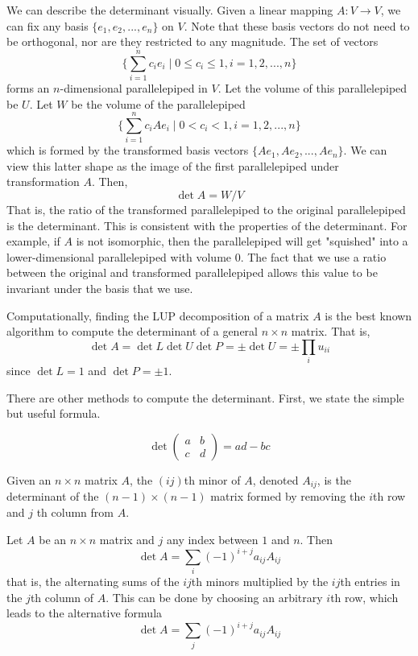   We can describe the determinant visually. Given a linear mapping $A: V \longrightarrow V$, we can fix any basis $\{e_1, e_2, ..., e_n\}$ on $V$. Note that these basis vectors do not need to be orthogonal, nor are they restricted to any magnitude. The set of vectors 
  \[\Big\{ \sum_{i=1}^n c_i e_i \; | \; 0 \leq c_i \leq 1, i = 1, 2, ..., n\Big\}\]
  forms an $n$-dimensional parallelepiped in $V$. Let the volume of this parallelepiped be $U$. Let $W$ be the volume of the parallelepiped 
  \[\Big\{ \sum_{i=1}^n c_i A e_i \; | \; 0<c_i<1, i = 1, 2, ..., n\Big\}\]
  which is formed by the transformed basis vectors $\{Ae_1, Ae_2, ..., Ae_n\}$. We can view this latter shape as the image of the first parallelepiped under transformation $A$. Then, 
  \[ \det{A} = W / V \]
  That is, the ratio of the transformed parallelepiped to the original parallelepiped is the determinant. This is consistent with the properties of the determinant. For example, if $A$ is not isomorphic, then the parallelepiped will get "squished" into a lower-dimensional parallelepiped with volume $0$. The fact that we use a ratio between the original and transformed parallelepiped allows this value to be invariant under the basis that we use. 

  Computationally, finding the LUP decomposition of a matrix $A$ is the best known algorithm to compute the determinant of a general $n \times n$ matrix. That is, 
  \[ \det{A} = \det{L} \det{U} \det{P} = \pm \det{U} = \pm \prod_i u_{i i}\]
  since $\det{L} = 1$ and $\det{P} = \pm 1$. 

  There are other methods to compute the determinant. First, we state the simple but useful formula.

  \begin{proposition}
  \[\det{\begin{pmatrix}
  a&b\\c&d 
  \end{pmatrix}} = a d - b c\] 
  \end{proposition}

  \begin{definition}
  Given an $n \times n$ matrix $A$, the $(i j)$th minor of $A$, denoted $A_{i j}$, is the determinant of the $(n-1) \times (n-1)$ matrix formed by removing the $i$th row and $j$ th column from $A$. 
  \end{definition}

  \begin{theorem}
  Let $A$ be an $n \times n$ matrix and $j$ any index between $1$ and $n$. Then
  \[\det{A} = \sum_i (-1)^{i + j} a_{i j} A_{i j}\]
  that is, the alternating sums of the $ij$th minors multiplied by the $ij$th entries in the $j$th column of $A$. This can be done by choosing an arbitrary $i$th row, which leads to the alternative formula 
  \[\det{A} = \sum_j (-1)^{i + j} a_{i j} A_{i j} \]
  \end{theorem}

